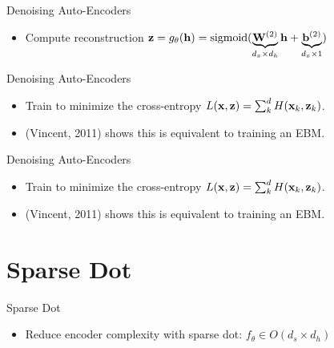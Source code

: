\documentclass{beamer}
\begin{document}
\begin{frame}{Denoising Auto-Encoders}
\begin{center}
	\begin{figure}[htbp]
		\resizebox{0.8\linewidth}{!}{}
	\end{figure}
\end{center}

\begin{itemize}
\item Compute reconstruction ${\bf z} = g_\theta({\bf h})=\mathrm{sigmoid}(\underbrace{{\bf W}^{(2)}}_{d_x\times d_h} {\bf h} + \underbrace{{\bf b}^{(2)}}_{d_x \times 1})$
\end{itemize}
\end{frame}

\begin{frame}{Denoising Auto-Encoders}
\begin{center}
	\begin{figure}[htbp]
		\resizebox{0.8\linewidth}{!}{}
	\end{figure}
\end{center}

\begin{itemize}
\item Train to minimize the cross-entropy
$L({\bf x}, {\bf z}) = \sum_k^d H({\bf x}_k, {\bf z}_k)$.
\item (Vincent, 2011) shows this is equivalent to training an EBM.
\end{itemize}
\end{frame}

\begin{frame}{Denoising Auto-Encoders}
\begin{center}
	\begin{figure}[htbp]
		\resizebox{0.8\linewidth}{!}{}
	\end{figure}
\end{center}

\begin{itemize}
\item Train to minimize the cross-entropy
$L({\bf x}, {\bf z}) = \sum_k^d H({\bf x}_k, {\bf z}_k)$.
\item (Vincent, 2011) shows this is equivalent to training an EBM.
\end{itemize}
\end{frame}

\section{Sparse Dot}
\begin{frame}{Sparse Dot}
\begin{itemize}
\item Reduce encoder complexity with sparse dot: $f_\theta \in O(d_s\times d_h)$
\end{itemize}
\end{frame}
\end{document}
